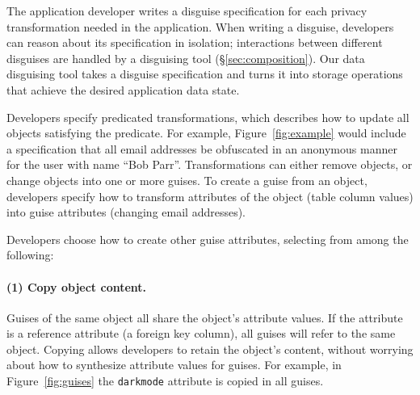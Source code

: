 The application developer writes a disguise specification for each privacy transformation needed
in the application.
%
When writing a disguise, developers can reason about its
specification in isolation; interactions between different disguises are handled by a disguising
tool (\S\ref{sec:composition}).
%
%
Our data disguising tool takes a disguise specification and turns it into storage operations that
achieve the desired application data state.

Developers specify predicated transformations, which describes how to update all objects satisfying
the predicate. For example, Figure~\ref{fig:example} would include a specification that all email
addresses be obfuscated in an anonymous manner for the user with name ``Bob Parr''.
%
Transformations can either remove objects, or change objects into one or more guises.
To create a guise from an object, developers specify how to transform attributes of the
object (\eg table column values) into guise attributes (\eg changing email addresses).

\iffalse
Developers choose how to create other guise attributes, selecting from among the following:
%
\paragraph{(1) Copy object content.}
%
Guises of the same object all share the object's attribute values.
%
If the attribute is a reference attribute (\eg a foreign key column), all guises will refer to the same object.
%
%
Copying allows developers to retain the object's content, without worrying about how to
synthesize attribute values for guises.
%
For example, in Figure~\ref{fig:guises} the \texttt{darkmode} attribute is copied in
all guises.

